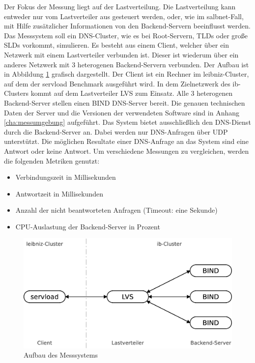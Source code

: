 \documentclass[a4paper, 12pt, BCOR10mm, DIV12, toc=bibliography, toc=listof, german]{scrbook}
\begin{document}
		Der Fokus der Messung liegt auf der Lastverteilung. Die Lastverteilung kann entweder nur vom
		Lastverteiler aus gesteuert werden, oder, wie im salbnet-Fall, mit Hilfe zusätzlicher
		Informationen von den Backend-Servern beeinflusst werden. Das Messsystem soll ein DNS-Cluster,
		wie es bei Root-Servern, TLDs oder große SLDs vorkommt, simulieren.  Es besteht aus einem
		Client, welcher über ein Netzwerk mit einem Lastverteiler verbunden ist. Dieser ist wiederum
		über ein anderes Netzwerk mit 3 heterogenen Backend-Servern verbunden. Der Aufbau ist in
		Abbildung \ref{fig:messsystem} grafisch dargestellt. Der Client ist ein Rechner im
		leibniz-Cluster, auf dem der servload Benchmark \cite{menski2012} ausgeführt wird. In dem
		Zielnetzwerk des ib-Clusters kommt auf dem Lastverteiler LVS zum Einsatz. Alle 3 heterogenen
		Backend-Server stellen einen BIND DNS-Server bereit. Die genauen technischen Daten der Server
		und die Versionen der verwendeten Software sind in Anhang \ref{cha:messumgebung} aufgeführt.
		Das System bietet ausschließlich den DNS-Dienst durch die Backend-Server an. Dabei werden nur
		DNS-Anfragen über UDP unterstützt. Die möglichen Resultate einer DNS-Anfrage an das System sind
		eine Antwort oder keine Antwort. Um verschiedene Messungen zu vergleichen, werden die folgenden
		Metriken genutzt:

		\begin{itemize}
			\item Verbindungszeit in Millisekunden
			\item Antwortzeit in Millisekunden
			\item Anzahl der nicht beantworteten Anfragen (Timeout: eine Sekunde)
			\item CPU-Auslastung der Backend-Server in Prozent
		\end{itemize}

		\begin{figure}
			\centering
			\includegraphics[width=12cm]{images/test-system}
			\caption{Aufbau des Messsystems}
			\label{fig:messsystem}
		\end{figure}
\end{document}
